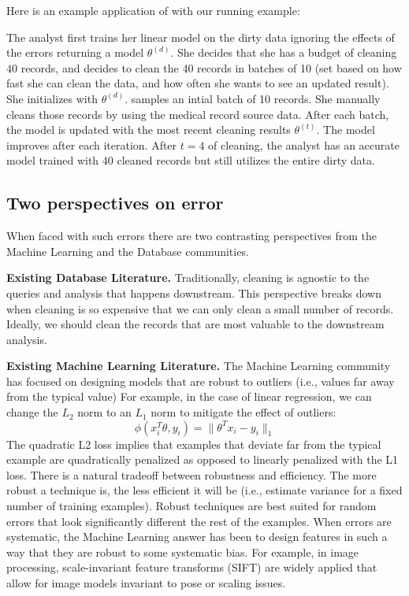 \noindent Here is an example application of \sys with our running example:
\begin{example}
The analyst first trains her linear model on the dirty data ignoring the effects of the errors returning a model $\theta^{(d)}$.
She decides that she has a budget of cleaning $40$ records, and decides to clean the 40 records in batches of 10 (set based on how fast she can clean the data, and how often she wants to see an updated result).
She initializes \sys with $\theta^{(d)}$.
\sys samples an intial batch of 10 records.
She manually cleans those records by using the medical record source data.
After each batch, the model is updated with the most recent cleaning results $\theta^{(t)}$.
The model improves after each iteration.
After $t=4$ of cleaning, the analyst has an accurate model trained with 40 cleaned records but still utilizes the entire dirty data.
\end{example}

\iffalse

\subsection{Two perspectives on error}
When faced with such errors there are two contrasting perspectives from the Machine Learning and the Database communities.

\vspace{0.5em}

\noindent\textbf{Existing Database Literature. } 
Traditionally, cleaning is agnostic to the queries and analysis that happens downstream. 
This perspective breaks down when cleaning is so expensive that we can only clean a small number of records.
Ideally, we should clean the records that are most valuable to the downstream analysis.

\vspace{0.5em}

\noindent\textbf{Existing  Machine Learning Literature. } The Machine Learning community has focused on
designing models that are robust to outliers (i.e., values far away from the typical value)
For example, in the case of linear regression, we can change the $L_2$ norm to an $L_1$ norm to mitigate the effect of outliers:
\[
\phi(x_{i}^T\theta,y_{i}) = \|\theta^Tx_{i} - y_i \|_1
\]
The quadratic L2 loss implies that examples that deviate far from the typical example are quadratically penalized as opposed to linearly penalized with the L1 loss.
There is a natural tradeoff between robustness and efficiency.
The more robust a technique is, the less efficient it will be (i.e., estimate variance for a fixed number of training examples).
Robust techniques are best suited for random errors that look significantly different the rest of the examples.
When errors are systematic, the Machine Learning answer has been to design features in such a way that they are robust to some systematic bias.
For example, in image processing, scale-invariant feature transforms (SIFT) are widely applied that allow for image models invariant to pose or scaling issues.

